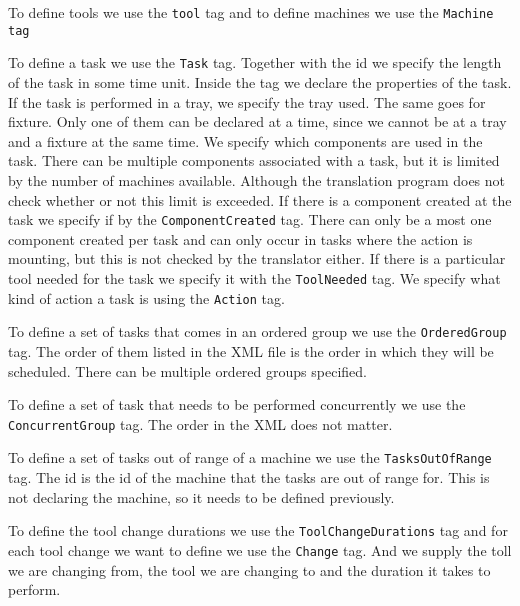 To define tools we use the \texttt{tool} tag and to define machines we use the \texttt{Machine tag}

To define a task we use the \texttt{Task} tag. Together with the id we specify the length of the task in some time unit. Inside the tag we declare the properties of the task. If the task is performed in a tray, we specify the tray used. The same goes for fixture. Only one of them can be declared at a time, since we cannot be at a tray and a fixture at the same time. We specify which components are used in the task. There can be multiple components associated with a task, but it is limited by the number of machines available. Although the translation program does not check whether or not this limit is exceeded. If there is a component created at the task we specify if by the \texttt{ComponentCreated} tag. There can only be a most one component created per task and can only occur in tasks where the action is mounting, but this is not checked by the translator either. If there is a particular tool needed for the task we specify it with the \texttt{ToolNeeded} tag. We specify what kind of action a task is using the \texttt{Action} tag.

To define a set of tasks that comes in an ordered group we use the \texttt{OrderedGroup} tag. The order of them listed in the XML file is the order in which they will be scheduled. There can be multiple ordered groups specified.

To define a set of task that needs to be performed concurrently we use the \texttt{ConcurrentGroup} tag. The order in the XML does not matter.

To define a set of tasks out of range of a machine we use the \texttt{TasksOutOfRange} tag. The id is the id of the machine that the tasks are out of range for. This is not declaring the machine, so it needs to be defined previously.

To define the tool change durations we use the \texttt{ToolChangeDurations} tag and for each tool change we want to define we use the \texttt{Change} tag. And we supply the toll we are changing from, the tool we are changing to and the duration it takes to perform.

\begin{figure}

\end{figure}

